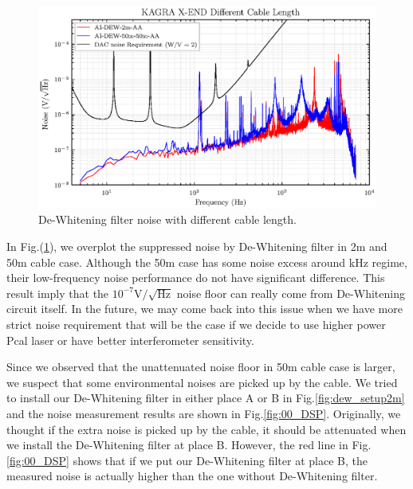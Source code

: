 \begin{figure}[hbt!]
\centering
\includegraphics[width=1\textwidth]{figure/noise/00_bothm}
\caption[De-Whitening filter noise with different cable length]{ De-Whitening filter noise with different cable length. }
\label{fig:00_bothm}
\end{figure}



In Fig.(\ref{fig:00_bothm}), we overplot the suppressed noise by De-Whitening filter in 2m and 50m cable case. Although the 50m case has some noise excess around kHz regime, their low-frequency noise performance do not have significant difference. This result imply that the $10^{-7}\mathrm{V}/\sqrt{\mathrm{Hz}}$ noise floor can really come from De-Whitening circuit itself. In the future, we may come back into this issue when we have more strict noise requirement that will be the case if we decide to use higher power Pcal laser or have better interferometer sensitivity.

Since we observed that the unattenuated noise floor in 50m cable case is larger, we suspect that some environmental noises are picked up by the cable. We tried to install our De-Whitening filter in either place A or B in Fig.\ref{fig:dew_setup2m} and the noise measurement results are shown in Fig.\ref{fig:00_DSP}. Originally, we thought if the extra noise is picked up by the cable, it should be attenuated when we install the De-Whitening filter at place B. However, the red line in Fig.\ref{fig:00_DSP} shows that if we put our De-Whitening filter at place B, the measured noise is actually higher than the one without De-Whitening filter. 


